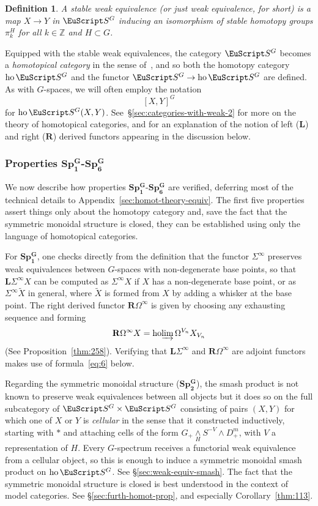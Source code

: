 \documentclass{amsart}
\newtheorem{definition}[equation]{Definition}
\newenvironment{defin}{\begin{definition}\rm}{\end{definition}}
\theoremstyle{definition}
\newtheorem{defin}[equation]{Definition}
\theoremstyle{remark}
\newcommand{\Z}{{\mathbb Z}}
\newcommand{\spectra}{\EuScript S}
\DeclareMathOperator{\ho}{ho}
\newcommand{\ugspectra}[1]{\spectra^{#1}}
\newcommand{\hocolim}{\ho\!\varinjlim}
\newcommand{\lder}{\mathbf{L}}
\newcommand{\rder}{\mathbf{R}}
\newcommand{\gswdes}[1]{\mathbf{Sp^{G}_{#1}}}
\begin{document}
\begin{defin}
A {\em stable weak equivalence} (or just {\em weak
equivalence}, for short) is a map $X\to Y$ in $\ugspectra{G}$
inducing an isomorphism of stable homotopy groups $\pi^{H}_{k}$ for
all $k\in \Z$ and $H\subset G$.
\end{defin}

Equipped with the stable weak equivalences, the category
$\ugspectra{G}$ becomes a {\em homotopical category} in the sense
of~\cite{dwyer04:_homot}, and so both the homotopy category
$\ho\ugspectra{G}$ and the functor $\ugspectra{G}\to\ho\ugspectra{G}$
are defined.  As with $G$-spaces, we will often employ the notation
\[
[X,Y]^{G}
\]
for $\ho\ugspectra{G}(X,Y)$.  See~\S\ref{sec:categories-with-weak-2}
for more on the theory of homotopical categories, and for an
explanation of the notion of left ($\lder$) and right ($\rder$)
derived functors appearing in the discussion below.


\subsubsection{Properties $\gswdes{1}$-$\gswdes{6}$}
\label{sec:prop-gswd-gswd} 

We now describe how properties $\gswdes{1}$-$\gswdes{6}$ are verified,
deferring most of the technical details to
Appendix~\ref{sec:homot-theory-equiv}.  The first five properties
assert things only about the homotopy category and, save the fact that
the symmetric monoidal structure is closed, they can be established
using only the language of homotopical categories.


For $\gswdes{1}$, one checks directly from the definition that the
functor $\Sigma^{\infty}$ preserves weak
equivalences between $G$-spaces with non-degenerate base points, so
that $\lder\Sigma^{\infty}X$ can be computed as $\Sigma^{\infty}X$ if
$X$ has a non-degenerate base point, or as $\Sigma^{\infty}\tilde X$
in general, where $\tilde X$ is formed from $X$ by adding a whisker at
the base point.  The right derived functor $\rder\Omega^{\infty}$ is
given by choosing any exhausting sequence and forming
\[
\rder\Omega^{\infty}X = \hocolim \Omega^{V_{n}}X_{V_{n}}
\]
(See Proposition~\ref{thm:258}).  Verifying that
$\lder\Sigma^{\infty}$ and $\rder\Omega^{\infty}$ are adjoint functors
makes use of formula~\eqref{eq:6} below.

Regarding the symmetric monoidal structure ($\gswdes{2}$), the smash
product is not known to preserve weak equivalences between all objects
but it does so on the full subcategory of
$\ugspectra{G}\times\ugspectra{G}$ consisting of pairs $(X,Y)$ for
which one of $X$ or $Y$ is {\em cellular} in the sense that it
constructed inductively, starting with $\ast$ and attaching cells of
the form $G_{+}\underset{H}{\wedge}S^{-V}\wedge D^{m}_{+}$, with $V$ a
representation of $H$.  Every $G$-spectrum receives a functorial weak
equivalence from a cellular object, so this is enough to induce a
symmetric monoidal smash product on $\ho\ugspectra{G}$.  See
\S\ref{sec:weak-equiv-smash}.  The fact that the symmetric monoidal
structure is closed is best understood in the context of model
categories.  See \S\ref{sec:furth-homot-prop}, and especially
Corollary~\ref{thm:113}.
\end{document}
